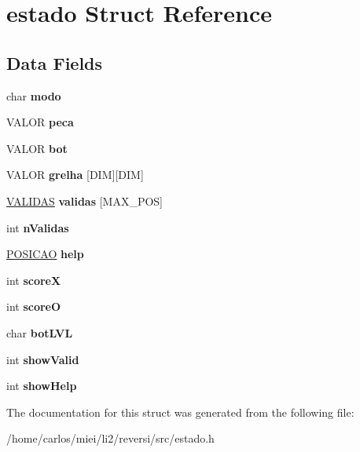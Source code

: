 \hypertarget{structestado}{}\section{estado Struct Reference}
\label{structestado}
\subsection*{Data Fields}
\begin{DoxyCompactItemize}
\item 
\mbox{\label{structestado_a8bdf62f83bb8988045d5016da2b43779}} 
char {\bfseries modo}
\item 
\mbox{\label{structestado_ab36ee9db06349bf2088d6b16381fdef1}} 
V\+A\+L\+OR {\bfseries peca}
\item 
\mbox{\label{structestado_a66400d1dca704d553f6ce767104ca819}} 
V\+A\+L\+OR {\bfseries bot}
\item 
\mbox{\label{structestado_abcc63612fff1a568657c28df77677d58}} 
V\+A\+L\+OR {\bfseries grelha} \mbox{[}D\+IM\mbox{]}\mbox{[}D\+IM\mbox{]}
\item 
\mbox{\label{structestado_a7c8f777cfeace5057a4f2b8a19dea312}} 
\mbox{\hyperlink{structvirar}{V\+A\+L\+I\+D\+AS}} {\bfseries validas} \mbox{[}M\+A\+X\+\_\+\+P\+OS\mbox{]}
\item 
\mbox{\label{structestado_affc22a1b3410bcbdff7650ad158db769}} 
int {\bfseries n\+Validas}
\item 
\mbox{\label{structestado_ab235d24aec169757396181dddd54c0d3}} 
\mbox{\hyperlink{structposicao}{P\+O\+S\+I\+C\+AO}} {\bfseries help}
\item 
\mbox{\label{structestado_ade34eb5d0a45aafc63b864b5cd9227b2}} 
int {\bfseries scoreX}
\item 
\mbox{\label{structestado_a007ef67b83a1bbcac57660fd83e24663}} 
int {\bfseries scoreO}
\item 
\mbox{\label{structestado_a3ffa8a7277103cddd9e53f4b0ed07ab5}} 
char {\bfseries bot\+L\+VL}
\item 
\mbox{\label{structestado_afce98a387fa135f5b627c270f1609f38}} 
int {\bfseries show\+Valid}
\item 
\mbox{\label{structestado_a9c84e39efe0be9b4758674450890dc9a}} 
int {\bfseries show\+Help}
\end{DoxyCompactItemize}


The documentation for this struct was generated from the following file\+:\begin{DoxyCompactItemize}
\item 
/home/carlos/miei/li2/reversi/src/estado.\+h\end{DoxyCompactItemize}
